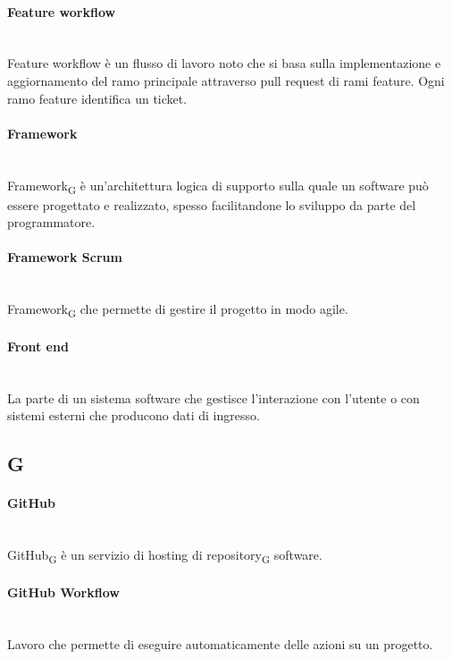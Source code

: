 \paragraph{Feature workflow}~\smallskip \\
Feature workflow è un flusso di lavoro noto che si basa sulla implementazione e aggiornamento del ramo principale attraverso pull request di rami feature. Ogni ramo feature identifica un ticket.

\paragraph{Framework}~\smallskip \\
Framework\textsubscript{G} è un'architettura logica di supporto sulla quale un software può essere progettato e realizzato, spesso facilitandone lo sviluppo da parte del programmatore.

\paragraph{Framework Scrum}~\smallskip \\
Framework\textsubscript{G} che permette di gestire il progetto in modo agile.

\paragraph{Front end}~\smallskip \\
La parte di un sistema software che gestisce l'interazione con l'utente o con sistemi esterni che producono dati di ingresso.

\newpage
{}
\subsection*{G}
\paragraph{GitHub}~\smallskip \\
GitHub\textsubscript{G} è un servizio di hosting di repository\textsubscript{G} software.

\paragraph{GitHub Workflow}~\smallskip \\
Lavoro che permette di eseguire automaticamente delle azioni su un progetto.
\newpage
{}
